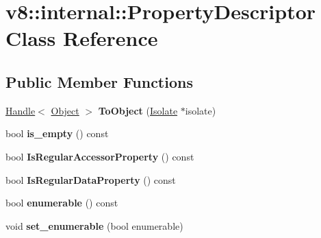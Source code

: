 \hypertarget{classv8_1_1internal_1_1_property_descriptor}{}\section{v8\+:\+:internal\+:\+:Property\+Descriptor Class Reference}
\label{classv8_1_1internal_1_1_property_descriptor}
\subsection*{Public Member Functions}
\begin{DoxyCompactItemize}
\item 
\hyperlink{classv8_1_1internal_1_1_handle}{Handle}$<$ \hyperlink{classv8_1_1internal_1_1_object}{Object} $>$ {\bfseries To\+Object} (\hyperlink{classv8_1_1internal_1_1_isolate}{Isolate} $\ast$isolate)\hypertarget{classv8_1_1internal_1_1_property_descriptor_af72e01c383fab1b3b629dfa597aa10c6}{}\label{classv8_1_1internal_1_1_property_descriptor_af72e01c383fab1b3b629dfa597aa10c6}

\item 
bool {\bfseries is\+\_\+empty} () const \hypertarget{classv8_1_1internal_1_1_property_descriptor_a37c211d407310e3d4fc148cc1fec1657}{}\label{classv8_1_1internal_1_1_property_descriptor_a37c211d407310e3d4fc148cc1fec1657}

\item 
bool {\bfseries Is\+Regular\+Accessor\+Property} () const \hypertarget{classv8_1_1internal_1_1_property_descriptor_a8e6d00ce196a3b687adbfcbba25aaaf9}{}\label{classv8_1_1internal_1_1_property_descriptor_a8e6d00ce196a3b687adbfcbba25aaaf9}

\item 
bool {\bfseries Is\+Regular\+Data\+Property} () const \hypertarget{classv8_1_1internal_1_1_property_descriptor_a5498bfb849bd84aa4abf3c42ac782e4e}{}\label{classv8_1_1internal_1_1_property_descriptor_a5498bfb849bd84aa4abf3c42ac782e4e}

\item 
bool {\bfseries enumerable} () const \hypertarget{classv8_1_1internal_1_1_property_descriptor_af4365a47fb0c7369679fc025ab0253a5}{}\label{classv8_1_1internal_1_1_property_descriptor_af4365a47fb0c7369679fc025ab0253a5}

\item 
void {\bfseries set\+\_\+enumerable} (bool enumerable)\hypertarget{classv8_1_1internal_1_1_property_descriptor_ad0610148504842c6bed7c75dd978a36f}{}\label{classv8_1_1internal_1_1_property_descriptor_ad0610148504842c6bed7c75dd978a36f}


\end{DoxyCompactItemize}
